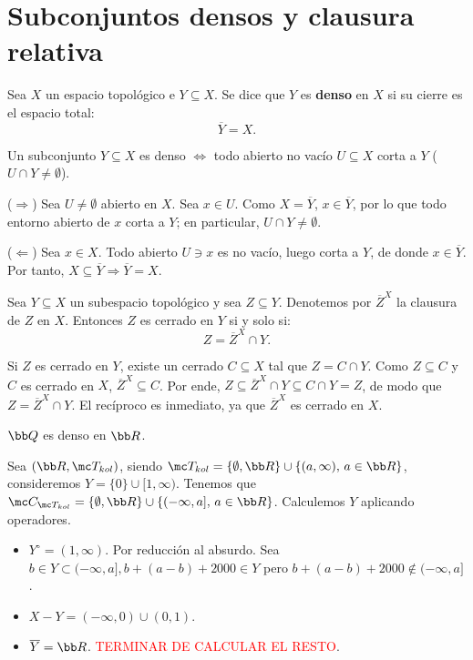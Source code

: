 \section{Subconjuntos densos y clausura relativa}

\begin{defi}
Sea $X$ un espacio topológico e $Y \subseteq X$. Se dice que $Y$ es \textbf{denso} en $X$ si su cierre es el espacio total:
\[
    \overline{Y} = X.
\]
\end{defi}

\begin{prop}
Un subconjunto $Y \subseteq X$ es denso $\iff$ todo abierto no vacío $U \subseteq X$ corta a $Y$ ($U \cap Y \ne \emptyset$).
\end{prop}

\begin{dem}
($\Rightarrow$) Sea $U \ne \emptyset$ abierto en $X$. Sea $x \in U$. Como $X = \overline{Y}$, $x \in \overline{Y}$, por lo que todo entorno abierto de $x$ corta a $Y$; en particular, $U \cap Y \ne \emptyset$.

($\Leftarrow$) Sea $x \in X$. Todo abierto $U \ni x$ es no vacío, luego corta a $Y$, de donde $x \in \overline{Y}$. Por tanto, $X \subseteq \overline{Y} \Rightarrow \overline{Y} = X$.
\end{dem}

\begin{prop}
Sea $Y \subseteq X$ un subespacio topológico y sea $Z \subseteq Y$. Denotemos por $\overline{Z}^X$ la clausura de $Z$ en $X$. Entonces $Z$ es cerrado en $Y$ si y solo si:
\[
    Z = \overline{Z}^X \cap Y.
\]
\end{prop}

\begin{dem}
Si $Z$ es cerrado en $Y$, existe un cerrado $C \subseteq X$ tal que $Z = C \cap Y$. Como $Z \subseteq C$ y $C$ es cerrado en $X$, $\overline{Z}^X \subseteq C$. Por ende, $Z \subseteq \overline{Z}^X \cap Y \subseteq C \cap Y = Z$, de modo que $Z = \overline{Z}^X \cap Y$. El recíproco es inmediato, ya que $\overline{Z}^X$ es cerrado en $X$.
\end{dem}
\begin{ejem}
    $\bb Q$ es denso en $\bb R$.
\end{ejem}
\begin{ejem}
    Sea $(\bb R, \mc T_{kol})$, siendo $\mc T_{kol} = \{\emptyset, \bb R\} \cup \{(a,\infty), \, a \in \bb R\}$, consideremos $Y = \{0\} \cup [1,\infty)$. Tenemos que $\mc C_{\mc T_{kol}}= \{\emptyset, \bb R\} \cup\{(-\infty, a] , \, a\in \bb R\}$. Calculemos $Y$ aplicando operadores.
    \begin{itemize}
        \item $Y^{\circ} = (1, \infty)$. Por reducción al absurdo. Sea $b \in Y \subset (-\infty, a], b+(a-b)+2000 \in Y$ pero $b+(a-b)+2000 \nin (-\infty, a]$. 
        \item $X-Y = (-\infty, 0) \cup (0,1)$.
        \item $\overline{Y} = \bb R$. \textcolor{red}{TERMINAR DE CALCULAR EL RESTO}. 
    \end{itemize}
\end{ejem}



